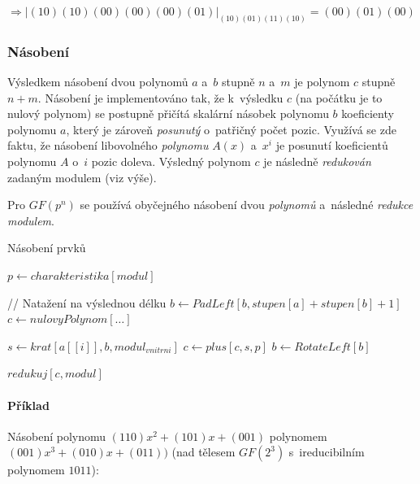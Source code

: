 \documentclass[thesis=M,czech,hidelinks]{FITthesis}[2012/06/26]
\newcommand{\0}{{\textcolor[gray]{0.75}{0}}}
\newenvironment{algoritmus}{
    \floatname{algorithm}{Algoritmus}
    \begin{algorithm}
}{\end{algorithm}}
\begin{document}
$
    \Rightarrow
    \left| (10)(10)(00)(00)(00)(01) \right|_{(10)(01)(11)(10)} = (00)(01)(00)
$


\subsubsection{Násobení}

Výsledkem násobení dvou polynomů $a$ a~$b$ stupně $n$ a~$m$ je polynom $c$
stupně $n+m$. Násobení je implementováno tak, že k~výsledku $c$ (na počátku je
to nulový polynom) se postupně přičítá skalární násobek polynomu $b$ koeficienty
polynomu $a$, který je zároveň \emph{posunutý} o~patřičný počet pozic. Využívá
se zde faktu, že násobení libovolného \emph{polynomu} $A(x)$ a~$x^i$ je posunutí
koeficientů polynomu $A$ o~$i$ pozic doleva. Výsledný polynom $c$ je následně
\emph{redukován} zadaným modulem (viz výše).

Pro $GF(p^n)$ se používá obyčejného násobení dvou \emph{polynomů} a~následné
\emph{redukce} \emph{modulem}.

\begin{algoritmus}[!ht]
    \caption{Násobení prvků}
    \begin{algorithmic}[1]
        \State $ p \gets charakteristika[ modul ] $

        // Natažení na výslednou délku
        \State $ b \gets PadLeft[ b, stupen[a] + stupen[b] + 1 ] $
        \State $ c \gets nulovyPolynom[\ldots ] $

        \hfil
            \State $ s \gets krat[ a[[i]], b, modul_{vnitrni} ] $
            \State $ c \gets plus[ c, s, p ] $
            \State $ b \gets RotateLeft[b] $
        \EndFor

        \hfil
        \State \Return $redukuj[c,modul]$
     \EndFunction
    \end{algorithmic}
\end{algoritmus}

\paragraph{Příklad} Násobení polynomu $(110)x^2 + (101)x + (001)$ polynomem
$(001)x^3 + (010)x + (011))$ (nad tělesem $GF(2^3)$ s~ireducibilním
polynomem $1011$):
\end{document}
